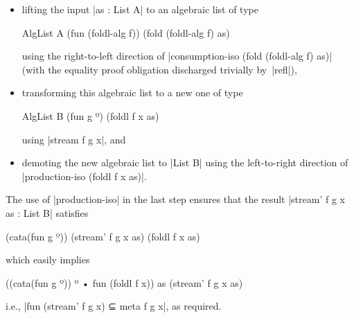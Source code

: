 \begin{itemize}
\item lifting the input |as : List A| to an algebraic list of type
\begin{code}
AlgList A (fun (foldl-alg f)) (fold (foldl-alg f) as)
\end{code}
using the right-to-left direction of |consumption-iso (fold (foldl-alg f) as)| (with the equality proof obligation discharged trivially by~|refl|),
\item transforming this algebraic list to a new one of type
\begin{code}
AlgList B (fun g º) (foldl f x as)
\end{code}
using |stream f g x|, and
\item demoting the new algebraic list to |List B| using the left-to-right direction of |production-iso (foldl f x as)|.
\end{itemize}
The use of |production-iso| in the last step ensures that the result |stream' f g x as : List B| satisfies
\begin{code}
(cata(fun g º)) (stream' f g x as) (foldl f x as)
\end{code}
which easily implies
\begin{code}
((cata(fun g º)) º • fun (foldl f x)) as (stream' f g x as)
\end{code}
i.e., |fun (stream' f g x) ⊆ meta f g x|, as required.

